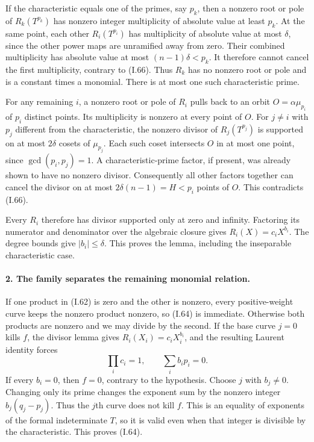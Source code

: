 \documentclass[11pt,a4paper]{article}
\theoremstyle{definition}\newtheorem{definition}{Definition}
\begin{document}
If the characteristic equals one of the primes, say $p_k$,
then a nonzero root or pole of $R_k(T^{p_k})$ has nonzero
integer multiplicity of absolute value at least $p_k$.
At the same point, each other $R_i(T^{p_i})$ has multiplicity
of absolute value at most $\delta$, since the other power
maps are unramified away from zero.  Their combined
multiplicity has absolute value at most $(n-1)\delta<p_k$.
It therefore cannot cancel the first multiplicity, contrary
to (I.66).  Thus $R_k$ has no nonzero root or pole and is
a constant times a monomial.  There is at most one such
characteristic prime.

For any remaining $i$, a nonzero root or pole of $R_i$
pulls back to an orbit $O=\alpha\mu_{p_i}$ of $p_i$
distinct points.  Its multiplicity is nonzero at every
point of $O$.  For $j\ne i$ with $p_j$ different from the
characteristic, the nonzero divisor of $R_j(T^{p_j})$
is supported on at most $2\delta$ cosets of $\mu_{p_j}$.
Each such coset intersects $O$ in at most one point, since
$\gcd(p_i,p_j)=1$.  A characteristic-prime factor, if
present, was already shown to have no nonzero divisor.
Consequently all other factors together can cancel the
divisor on at most $2\delta(n-1)=H<p_i$ points of $O$.
This contradicts (I.66).

Every $R_i$ therefore has divisor supported only at zero
and infinity.  Factoring its numerator and denominator
over the algebraic closure gives $R_i(X)=c_iX^{b_i}$.
The degree bounds give $|b_i|\le\delta$.  This proves
the lemma, including the inseparable characteristic case.

\paragraph{2. The family separates the remaining monomial relation.}
If one product in (I.62) is zero and the other is nonzero,
every positive-weight curve keeps the nonzero product
nonzero, so (I.64) is immediate.  Otherwise both products
are nonzero and we may divide by the second.
If the base curve $j=0$ kills $f$, the divisor lemma gives
$R_i(X_i)=c_iX_i^{b_i}$, and the resulting Laurent identity
forces
\[
 \prod_i c_i=1,\qquad\sum_i b_ip_i=0.
\]
If every $b_i=0$, then $f=0$, contrary to the hypothesis.
Choose $j$ with $b_j\ne0$.  Changing only its prime changes
the exponent sum by the nonzero integer
$b_j(q_j-p_j)$.  Thus the $j$th curve does not kill $f$.
This is an equality of exponents of the formal indeterminate
$T$, so it is valid even when that integer is divisible by
the characteristic.  This proves (I.64).
\end{document}

